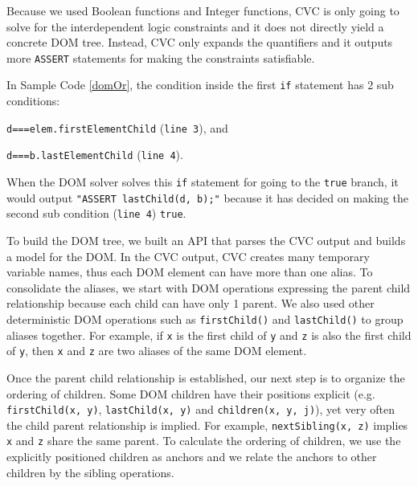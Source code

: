 Because we used Boolean functions and Integer functions, CVC is only going to solve for the interdependent logic constraints and it does not directly yield a concrete DOM tree.  
Instead, CVC only expands the quantifiers and it outputs more {\tt ASSERT} statements for making the constraints satisfiable.  

In Sample Code \ref{domOr}, the condition inside the first {\tt if} statement has 2 sub conditions: 
\begin{compactitem}
\item {\tt d===elem.firstElementChild} ({\tt line 3}), and 
\item {\tt d===b.lastElementChild} ({\tt line 4}).
\end{compactitem}
When the DOM solver solves this {\tt if} statement for going to the {\tt true} branch, it would output {\tt "ASSERT lastChild(d, b);"} because it has decided on making the second sub condition ({\tt line 4}) {\tt true}.

To build the DOM tree, we built an API that parses the CVC output and builds a model for the DOM.  
In the CVC output, CVC creates many temporary variable names, thus each DOM element can have more than one alias.  
To consolidate the aliases, we start with DOM operations expressing the parent child relationship because each child can have only 1 parent.  
We also used other deterministic DOM operations such as {\tt firstChild()} and {\tt lastChild()} to group aliases together.  
For example, if {\tt x} is the first child of {\tt y} and {\tt z} is also the first child of {\tt y}, then {\tt x} and {\tt z} are two aliases of the same DOM element.  

Once the parent child relationship is established, our next step is to organize the ordering of children.  
Some DOM children have their positions explicit (e.g. {\tt firstChild(x, y)}, {\tt lastChild(x, y)} and {\tt children(x, y, j)}), yet very often the child parent relationship is implied.  For example, {\tt nextSibling(x, z)} implies {\tt x} and {\tt z} share the same parent.  
To calculate the ordering of children, we use the explicitly positioned children as anchors and we relate the anchors to other children by the sibling operations.  



